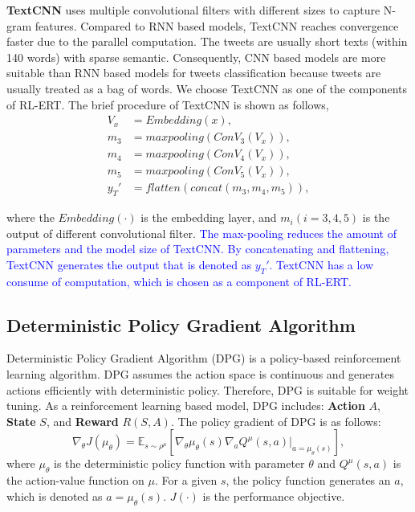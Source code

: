 \documentclass[review]{elsarticle}
\begin{document}
\textbf{TextCNN} \cite{DBLP:conf/emnlp/Kim14} uses multiple convolutional filters with different sizes to capture N-gram features. Compared to RNN based models, TextCNN reaches convergence faster due to the parallel computation. The tweets are usually short texts (within 140 words) with sparse semantic. Consequently, CNN based models are more suitable than RNN based models for tweets classification because tweets are usually treated as a bag of words. We choose TextCNN as one of the components of RL-ERT. The brief procedure of TextCNN is shown as follows,
\begin{align}\label{eq:tcnn}
V_x &= Embedding(x), \\
m_3 &= maxpooling(ConV_3(V_x)),\\
m_4 &= maxpooling(ConV_4(V_x)),\\
m_5 &= maxpooling(ConV_5(V_x)),\\
y_T' &= flatten(concat(m_3, m_4, m_5)),
\end{align}

where the $Embedding(\cdot)$ is the embedding layer, and $m_i (i = 3,4,5)$ is the output of different convolutional filter. \textcolor{blue}{The max-pooling reduces the amount of parameters and the model size of TextCNN. By concatenating and flattening, TextCNN generates the output that is denoted as $y_T'$. TextCNN has a low consume of computation, which is chosen as a component of RL-ERT.} 

\subsection{Deterministic Policy Gradient Algorithm}
Deterministic Policy Gradient Algorithm (DPG) \cite{DBLP:conf/icml/SilverLHDWR14} is a policy-based reinforcement learning algorithm. DPG assumes the action space is continuous and generates actions efficiently with deterministic policy. Therefore, DPG is suitable for weight tuning. As a reinforcement learning based model, DPG includes: \textbf{Action} $A$, \textbf{State} $S$, and \textbf{Reward} $R(S,A)$. The policy gradient of DPG is as follows:
\begin{equation}
\nabla_\theta J(\mu_\theta) =  \mathbb{E}_{s \sim \rho^\mu} \left[\nabla_\theta \mu_\theta (s)\nabla_a Q^\mu (s, a) |_{a = \mu_\theta(s)}  \right],
\end{equation}
where $\mu_\theta$ is the deterministic policy function with parameter $\theta$ and $Q^\mu(s, a)$ is the action-value function on $\mu$. For a given $s$, the policy function generates an $a$, which is denoted as $a=\mu_\theta(s)$. $J(\cdot)$ is the performance objective.
\end{document}

